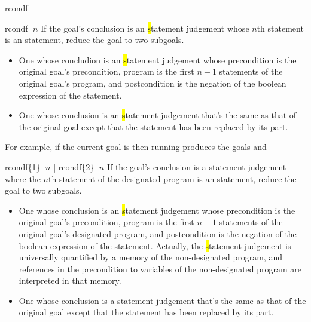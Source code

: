 \begin{tactic}{rcondf}
  \begin{tsyntax}{rcondf $\;n$}
    If the goal's conclusion is an \hl statement judgement whose $n$th
    statement is an  statement, reduce the goal to two
    subgoals.
    \begin{itemize}
    \item One whose concludion is an \hl statement judgement whose
      precondition is the original goal's precondition, program is the
      first $n-1$ statements of the original goal's program, and
      postcondition is the negation of the boolean expression of the
       statement.
   
    \item One whose conclusion is an \hl statement judgement that's
      the same as that of the original goal except that the 
      statement has been replaced by its  part.
    \end{itemize}

    \medskip For example, if the current goal is
     then
    running 
    produces the goals
     and
  \end{tsyntax}

  \begin{tsyntax}{rcondf\{1\} $\;n$ | rcondf\{2\} $\;n$}
    If the goal's conclusion is a \prhl statement judgement where the
    $n$th statement of the designated program is an  statement,
    reduce the goal to two subgoals.
    \begin{itemize}
    \item One whose conclusion is an \hl statement judgement whose
      precondition is the original goal's precondition, program is the
      first $n-1$ statements of the original goal's designated
      program, and postcondition is the negation of the boolean
      expression of the  statement. Actually, the \hl statement
      judgement is universally quantified by a memory of the
      non-designated program, and references in the precondition to
      variables of the non-designated program are interpreted in that
      memory.
   
    \item One whose conclusion is a \prhl statement judgement that's
      the same as that of the original goal except that the 
      statement has been replaced by its  part.
    \end{itemize}


\end{tsyntax}
\end{tactic}
